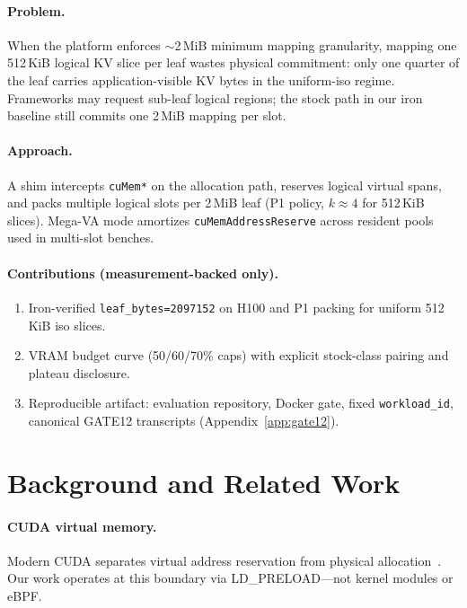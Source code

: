 \documentclass[11pt]{article}
\begin{document}
\paragraph{Problem.}
When the platform enforces ${\sim}$2\,MiB minimum mapping granularity, mapping one 512\,KiB logical KV slice per leaf wastes physical commitment: only one quarter of the leaf carries application-visible KV bytes in the uniform-iso regime.
Frameworks may request sub-leaf logical regions; the stock path in our iron baseline still commits one 2\,MiB mapping per slot.

\paragraph{Approach.}
A shim intercepts \texttt{cuMem*} on the allocation path, reserves logical virtual spans, and packs multiple logical slots per 2\,MiB leaf (P1 policy, $k{\approx}4$ for 512\,KiB slices).
Mega-VA mode amortizes \texttt{cuMemAddressReserve} across resident pools used in multi-slot benches.

\paragraph{Contributions (measurement-backed only).}
\begin{enumerate}
  \item Iron-verified \texttt{leaf\_bytes=2097152} on H100 and P1 packing for uniform 512\,KiB iso slices.
  \item VRAM budget curve (50/60/70\% caps) with explicit stock-class pairing and plateau disclosure.
  \item Reproducible artifact: evaluation repository, Docker gate, fixed \texttt{workload\_id}, canonical GATE12 transcripts (Appendix~\ref{app:gate12}).
\end{enumerate}

\section{Background and Related Work}

\paragraph{CUDA virtual memory.}
Modern CUDA separates virtual address reservation from physical allocation~\cite{cuda_prog_guide,cuda_driver_cuMem}.
Our work operates at this boundary via LD\_PRELOAD---not kernel modules or eBPF.
\end{document}
